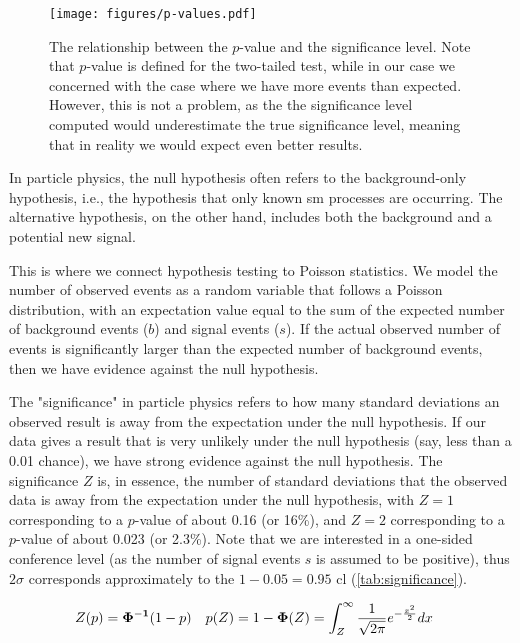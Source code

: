 \begin{figure}[htb]
    \centering
    \texttt{[image: figures/p-values.pdf]}
    \caption[The relationship between the $p$-value and the significance level.]
    {The relationship between the $p$-value and the significance level. Note that $p$-value is defined for the
        two-tailed test, while in our case we concerned with the case where we have more events than expected. However,
        this is not a problem, as the the significance level computed would underestimate the true significance level,
        meaning that in reality we would expect even better results.}
    \label{fig:p-values}
\end{figure}

In particle physics, the null hypothesis often refers to the background-only hypothesis, i.e., the hypothesis that only
known \gls{sm} processes are occurring. The alternative hypothesis, on the other hand, includes both the
background and a potential new signal.

This is where we connect hypothesis testing to Poisson statistics. We model the number of observed events as a random
variable that follows a Poisson distribution, with an expectation value equal to the sum of the expected number of
background events ($b$) and signal events ($s$). If the actual observed number of events is significantly larger than the
expected number of background events, then we have evidence against the null hypothesis.

The "significance" in particle physics refers to how many standard deviations an observed result is away from the
expectation under the null hypothesis. If our data gives a result that is very unlikely under the null hypothesis (say,
less than a 0.01 chance), we have strong evidence against the null hypothesis. The significance $Z$ is, in essence, the
number of standard deviations that the observed data is away from the expectation under the null hypothesis, with $Z =
    1$ corresponding to a $p$-value of about 0.16 (or 16\%), and $Z = 2$ corresponding to a $p$-value of about 0.023 (or
2.3\%). Note that we are interested in a one-sided conference level (as the number of signal events $s$ is assumed to be
positive), thus $2\sigma$ corresponds approximately to the $1-0.05=0.95$ \gls{cl} (\autoref{tab:significance}).

\begin{align}
    Z(p) & = \mathbf{\Phi^{-1}}(1 - p) & p(Z) & = 1 - \mathbf{\Phi}(Z) = \int_{Z}^{\infty} \frac{1}{\sqrt{2\pi}} e^{-\frac{x^2}{2}} dx
\end{align}

